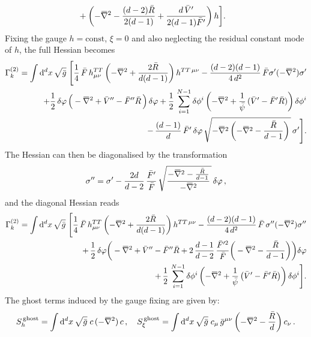 \documentclass[11pt]{book} %
\newcommand{\overbar}[1]{\mkern 1.5mu\overline{\mkern-1.5mu#1\mkern-1.5mu}\mkern 1.5mu}
\newcommand{\bnabla}{\overbar \nabla}
\newcommand{\rad}{\psi}
\numberwithin{equation}{chapter}
\begin{document}
\begin{appendices}
\begin{align}
    &+
    \left(
      -\bnabla^2
      -\frac{(d-2) \bar{R}}{2(d-1)}
      +\frac{d\,\bar{V}^{\prime}}{2(d-1)\bar{F}^{\prime}}
    \right)
    h
  \bigg] .
\end{align}
Fixing the gauge $h = \text{const}$, $\xi=0$ and also neglecting the residual constant mode of $h$,
the full Hessian becomes
\begin{align}
  \Gamma_k^{(2)} = \int \mathrm d^d x \, \sqrt{\bar{g}} \;
  \Bigg[
    \frac{1}{4} \, \bar{F} \, h^{TT}_{\mu\nu} \left( -\bnabla^2 + \frac{2 \bar{R}}{d(d-1)} \right) h^{TT\,\mu\nu}
    - \frac{(d-2)(d-1)}{4\,d^2} \, \bar{F} \sigma^{\prime} (-\bnabla^2) \sigma^{\prime}
    \nonumber\\
    +\frac{1}{2} \, \delta\varphi \, \Big( -\bnabla^2 + \bar V'' - \bar F''\bar{R} \, \Big) \, \delta\varphi
    +\frac{1}{2} \, \sum_{i=1}^{N-1} \delta\phi^i
    \left(-\bnabla^2
    +\frac{1}{\bar\rad} \, (\bar V'-\bar F'\bar{R})\right) \delta\phi^i
    \nonumber \\
    - \,   \frac{(d-1)}{d} \, \bar{F}^{\prime} \, \delta\varphi \,
    \sqrt{-\bnabla^2\left(-\bnabla^2-\frac{\bar{R}}{d-1}\right) \, } \, \sigma^{\prime}
  \Bigg] .
  \label{oldHessian}
\end{align}
The Hessian can then be diagonalised by the transformation
\begin{align}
  \sigma^{\prime\prime} = \sigma^{\prime}
  -\frac{2d}{d-2} \, \frac{\bar{F}^{\prime}}{\bar{F}}  \, \sqrt{\frac{-\bnabla^2-\frac{\bar{R}}{d-1}}{-\bnabla^2} \, } \, \delta\varphi\,,
\end{align}
and the diagonal Hessian reads
\begin{align}
  \Gamma_k^{(2)} = \int \mathrm{d}^d x \, \sqrt{\bar{g}} \;
  \Bigg[
    \frac{1}{4}\,\bar{F}\, h^{TT}_{\mu\nu} \left( -\bnabla^2
    + \frac{2 \bar{R}}{d(d-1)} \right) h^{TT\,\mu\nu}
    - \frac{(d-2)(d-1)}{4\,d^2} \, \bar{F} \, \sigma^{\prime\prime} (-\bnabla^2) \sigma^{\prime\prime}
    \nonumber\\
    +\, \frac{1}{2} \, \delta\varphi
    \bigg(
      - \bnabla^2 + \bar V'' - \bar F'' \bar R
      + 2 \, \frac{d-1}{d-2} \, \frac{\bar{F}^{\prime 2}}{\bar{F}}
      \bigg(
        -\bnabla^2 - \frac{\bar{R}}{d-1}
      \bigg)
    \bigg) \delta\varphi \nonumber \\
    +\,\frac{1}{2} \, \sum_{i=1}^{N-1} \delta\phi^i
    \left( -\bnabla^2
    +\frac{1}{\bar\rad} \, \big( \bar V'-\bar F'\bar{R} \big)\right)\delta\phi^i
  \Bigg] .
  \label{hessfinal}
\end{align}
The ghost terms induced by the gauge fixing are given by:
\begin{align}
  S^{\,\mathrm{ghost}}_{h} = \int \mathrm d^dx \, \sqrt{\bar g} \; c \, (-\bnabla^2) \, c \,,
  \quad
  S^{\,\mathrm{ghost}}_{\xi} = \int \mathrm d^dx \, \sqrt{\bar g} \;  c_\mu \, \bar g^{\mu\nu}
  \left(-\bnabla^2-\frac{\bar R}{d}\right) c_\nu \,.
  \label{ghosts}
\end{align}



\end{appendices}
\end{document}
